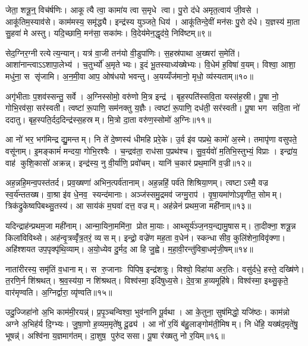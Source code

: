 जेता॒ शत्रू॒न्॒ विच॑र्\mbox{}षणिः। आकूत्यै त्वा॒ कामा॑य त्वा स॒मृधे त्वा। पु॒रो द॑धे अमृत॒त्वाय॑ जी॒वसे। आकू॑तिम॒स्याव॑से। काम॑मस्य॒ समृ॑द्ध्यै। इन्द्र॑स्य युञ्जते॒ धिय॑। आकू॑तिन्दे॒वीं मन॑सः पु॒रो द॑धे। य॒ज्ञस्य॑ मा॒ता सु॒हवा॑ मे अस्तु। यदि॒च्छामि॒ मन॑सा॒ सका॑मः। वि॒देय॑मेन॒द्धृद॑ये॒ निवि॑ष्टम्॥९॥

सेद॒ग्निर॒ग्नीरत्येत्य॒न्यान्। यत्र॑ वा॒जी तन॑यो वी॒डुपा॑णिः। स॒हस्र॑पाथा अ॒ख्षरा॑ स॒मेति॑। आशा॑नान्त्वाऽऽशापा॒लेभ्य॑। च॒तुर्भ्यो॑ अ॒मृतेभ्यः। इ॒दं भू॒तस्याध्य॑ख्षेभ्यः। वि॒धेम॑ ह॒विषा॑ व॒यम्। विश्वा॒ आशा॒ मधु॑ना॒ स सृ॑जामि। अ॒न॒मी॒वा आप॒ ओष॑धयो भवन्तु। अ॒यय्यँज॑मानो॒ मृधो॒ व्य॑स्यताम्॥१०॥

अगृ॑भीताः प॒शव॑स्सन्तु॒ सर्वे। अ॒ग्निस्सोमो॒ वरु॑णो मि॒त्र इन्द्र॑। बृह॒स्पति॑स्सवि॒ता यस्स॑ह॒स्री। पू॒षा नो॒ गोभि॒रव॑सा॒ सर॑स्वती। त्वष्टा॑ रू॒पाणि॒ सम॑नक्तु य॒ज्ञैः। त्वष्टा॑ रू॒पाणि॒ दध॑ती॒ सर॑स्वती। पू॒षा भग सवि॒ता नो॑ ददातु। बृह॒स्पति॒र्दद॒दिन्द्र॑स्स॒हस्रम्। मि॒त्रो दा॒ता वरु॑ण॒स्सोमो॑ अ॒ग्निः॥११॥\anuvakamend[क॒र॒न्निवि॑ष्टमस्यता॒न्नव॑ च]

आ नो॑ भर॒ भग॑मिन्द्र द्यु॒मन्तम्। नि ते॑ दे॒ष्णस्य॑ धीमहि प्ररे॒के। उ॒र्व इ॑व पप्रथे॒ कामो॑ अ॒स्मे। तमापृ॑णा वसुपते॒ वसू॑नाम्। इ॒मङ्कामं॑ मन्दया॒ गोभि॒रश्वैः। च॒न्द्रव॑ता॒ राध॑सा प॒प्रथ॑श्च। सु॒व॒र्यवो॑ म॒तिभि॒स्तुभ्यं॒ विप्राः। इन्द्रा॑य॒ वाह॑ कुशि॒कासो॑ अक्रन्न्। इन्द्र॑स्य॒ नु वी॒र्या॑णि॒ प्रवो॑चम्। यानि॑ च॒कार॑ प्रथ॒मानि॑ व॒ज्री॥१२॥

अह॒न्नहि॒मन्व॒पस्त॑तर्द। प्रव॒ख्षणा॑ अभिन॒त्पर्व॑तानाम्। अह॒न्नहिं॒ पर्व॑ते शिश्रिया॒णम्। त्वष्टाऽस्मै॒ वज्र स्व॒र्य॑न्ततख्ष। वा॒श्रा इ॑व धे॒नव॒ स्यन्द॑मानाः। अञ्ज॑स्समु॒द्रमव॑ जग्मु॒राप॑। वृ॒षा॒यमा॑णोऽवृणीत॒ सोमम्। त्रिक॑द्रुकेष्वपिबथ्सु॒तस्य॑। आ साय॑कं म॒घवा॑ दत्त॒ वज्रम्। अह॑न्नेनं प्रथम॒जा मही॑नाम्॥१३॥

यदिन्द्राह॑न्प्रथम॒जा मही॑नाम्। आन्मा॒यिना॒ममि॑ना॒ प्रोत मा॒याः। आथ्सूर्य॑ञ्ज॒नय॒न्द्यामु॒षासम्। ता॒दीक्ना॒ शत्रू॒न्न किला॑विविथ्से। अह॑न्वृ॒त्रव्वृँ॑त्र॒तरं॒ व्यसम्। इन्द्रो॒ वज्रे॑ण मह॒ता व॒धेन॑। स्कन्धासीव॒ कुलि॑शेना॒विवृ॑क्णा। अहि॑श्शयत उप॒पृक्पृ॑थि॒व्याम्। अ॒यो॒ध्येव दु॒र्मद॒ आ हि जु॒ह्वे। म॒हा॒वी॒रन्तु॑विबा॒धमृ॑जी॒षम्॥१४॥

नाता॑रीरस्य॒ समृ॑तिं व॒धानाम्। स रु॒जानाः पिपिष॒ इन्द्र॑शत्रुः। विश्वो॒ विहा॑या अर॒तिः। वसु॑र्दधे॒ हस्ते॒ दख्षि॑णे। त॒रणि॒र्न शि॑श्रथत्। श्र॒व॒स्य॑या॒ न शि॑श्रथत्। विश्व॑स्मा॒ इदि॑षुध्य॒से। दे॒व॒त्रा ह॒व्यमूहि॑षे। विश्व॑स्मा॒ इथ्सु॒कृते॒ वार॑मृण्वति। अ॒ग्निर्द्वारा॒ व्यृ॑ण्वति॥१५॥

उदु॒ज्जिहा॑नो अ॒भि काम॑मी॒रयन्न्॑। प्र॒पृ॒ञ्चन्विश्वा॒ भुव॑नानि पू॒र्वथा। आ के॒तुना॒ सुष॑मिद्धो॒ यजि॑ष्ठः। काम॑न्नो अग्ने अ॒भिह॑र्य दि॒ग्भ्यः। जु॒षा॒णो ह॒व्यम॒मृते॑षु दू॒ढ्य॑। आ नो॑ र॒यिं ब॑हु॒लाङ्गोम॑ती॒मिषम्। नि धे॑हि॒ यख्ष॑द॒मृते॑षु॒ भूषन्न्॑। अश्वि॑ना य॒ज्ञमाग॑तम्। दा॒शुष॒ पुरु॑दससा। पू॒षा र॑ख्षतु नो र॒यिम्॥१६॥

